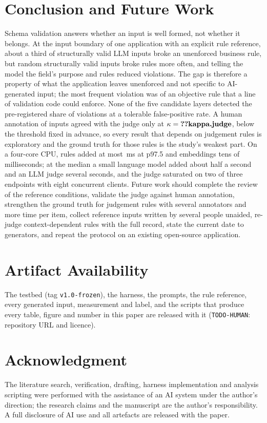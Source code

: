 \documentclass[conference]{IEEEtran}
\begin{document}
\section{Conclusion and Future Work}
\label{sec:conclusion}

Schema validation answers whether an input is well formed, not whether it belongs. At the input
boundary of one application with an explicit rule reference, about a third of structurally valid
LLM inputs broke an unenforced business rule, but random structurally valid inputs broke rules more
often, and telling the model the field's purpose and rules reduced violations. The gap is therefore
a property of what the application leaves unenforced and not specific to AI-generated input; the most frequent violation was of
an objective rule that a line of validation code could enforce. None of the five candidate layers
detected the pre-registered share of violations at a tolerable false-positive rate.\ifjudgeweak{} A
human annotation of  inputs agreed with the judge only at $\kappa=\R{kappa.judge}$, below
the threshold fixed in advance, so every result that depends on judgement rules is exploratory and the
ground truth for those rules is the study's weakest part.\fi{}
On a four-core CPU, rules added at most \,ms at p97.5 and embeddings tens of
milliseconds; at the median a small language model added about half a second and an LLM judge several
seconds, and the judge saturated on two of three endpoints with eight concurrent clients.
Future work should \ifreviewed\else complete the review of the reference conditions, \fi
\ifhumanlabels\else validate the judge against human annotation, \fi{} strengthen the ground truth for judgement rules with several
annotators and more time per item, collect reference inputs written by several people unaided, re-judge context-dependent rules with the full record, state the current date to generators,
and repeat the protocol on an existing open-source application.

\section*{Artifact Availability}

The testbed (tag \texttt{v1.0-frozen}), the harness, the prompts, the rule reference, every generated
input, measurement and label, and the scripts that produce every table, figure and number in this paper
are released with it (\texttt{TODO-HUMAN}: repository URL and licence).

\section*{Acknowledgment}

The literature search, verification, drafting, harness implementation and analysis scripting were
performed with the assistance of an AI system under the author's direction; the research claims and
the manuscript are the author's responsibility. A full disclosure of AI use and all artefacts are
released with the paper.



\end{document}
